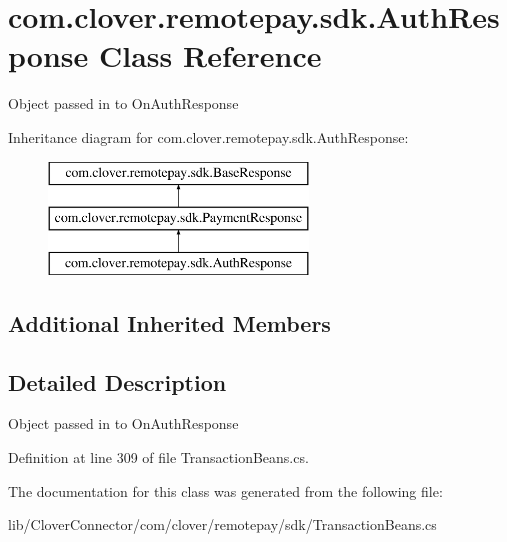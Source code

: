 \hypertarget{classcom_1_1clover_1_1remotepay_1_1sdk_1_1_auth_response}{}\section{com.\+clover.\+remotepay.\+sdk.\+Auth\+Response Class Reference}
\label{classcom_1_1clover_1_1remotepay_1_1sdk_1_1_auth_response}


Object passed in to On\+Auth\+Response  


Inheritance diagram for com.\+clover.\+remotepay.\+sdk.\+Auth\+Response\+:\begin{figure}[H]
\begin{center}
\leavevmode
\includegraphics[height=3.000000cm]{classcom_1_1clover_1_1remotepay_1_1sdk_1_1_auth_response}
\end{center}
\end{figure}
\subsection*{Additional Inherited Members}


\subsection{Detailed Description}
Object passed in to On\+Auth\+Response 



Definition at line 309 of file Transaction\+Beans.\+cs.



The documentation for this class was generated from the following file\+:\begin{DoxyCompactItemize}
\item 
lib/\+Clover\+Connector/com/clover/remotepay/sdk/Transaction\+Beans.\+cs\end{DoxyCompactItemize}
